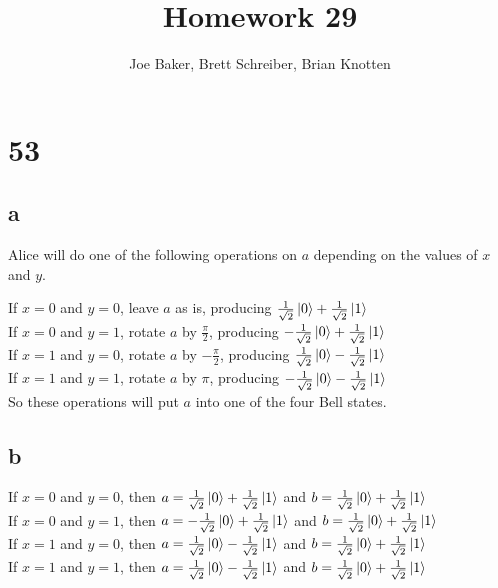 \documentclass[letterpaper,notitlepage,twoside]{article}
\begin{document}
\title{Homework 29}
\author{Joe Baker, Brett Schreiber, Brian Knotten}
\maketitle

\section*{53}
\subsection*{a}
Alice will do one of the following operations on $a$ depending on the values of $x$ and $y$.

If $x = 0$ and $y = 0$, leave $a$ as is, producing $\frac{1}{\sqrt 2} \ket{0} + \frac{1}{\sqrt 2} \ket{1}$ \\
If $x = 0$ and $y = 1$, rotate $a$ by $\frac{\pi}{2}$, producing $-\frac{1}{\sqrt 2} \ket{0} + \frac{1}{\sqrt 2} \ket{1}$ \\
If $x = 1$ and $y = 0$, rotate $a$ by $-\frac{\pi}{2}$, producing $\frac{1}{\sqrt 2} \ket{0} - \frac{1}{\sqrt 2} \ket{1}$  \\
If $x = 1$ and $y = 1$, rotate $a$ by $\pi$, producing $-\frac{1}{\sqrt 2} \ket{0} - \frac{1}{\sqrt 2} \ket{1}$  \\

So these operations will put $a$ into one of the four Bell states.

\subsection*{b}
If $x = 0$ and $y = 0$, then  $a = \frac{1}{\sqrt 2} \ket{0} + \frac{1}{\sqrt 2} \ket{1}$ and $b = \frac{1}{\sqrt 2} \ket{0} + \frac{1}{\sqrt 2} \ket{1}$ \\
If $x = 0$ and $y = 1$, then $a = -\frac{1}{\sqrt 2} \ket{0} + \frac{1}{\sqrt 2} \ket{1}$ and $b = \frac{1}{\sqrt 2} \ket{0} + \frac{1}{\sqrt 2} \ket{1}$ \\
If $x = 1$ and $y = 0$, then $a = \frac{1}{\sqrt 2} \ket{0} - \frac{1}{\sqrt 2} \ket{1}$ and $b = \frac{1}{\sqrt 2} \ket{0} + \frac{1}{\sqrt 2} \ket{1}$ \\
If $x = 1$ and $y = 1$, then $a =\frac{1}{\sqrt 2} \ket{0} - \frac{1}{\sqrt 2} \ket{1}$ and $b = \frac{1}{\sqrt 2} \ket{0} + \frac{1}{\sqrt 2} \ket{1}$ \\
\end{document}
